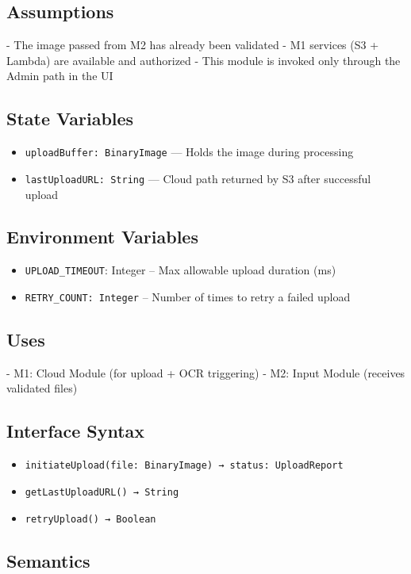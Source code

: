 \documentclass[12pt, titlepage]{article}
\begin{document}
\subsection*{Assumptions}
- The image passed from M2 has already been validated  
- M1 services (S3 + Lambda) are available and authorized  
- This module is invoked only through the Admin path in the UI

\subsection*{State Variables}
\begin{itemize}
  \item \texttt{uploadBuffer: BinaryImage} — Holds the image during processing  
  \item \texttt{lastUploadURL: String} — Cloud path returned by S3 after successful upload
\end{itemize}

\subsection*{Environment Variables}
\begin{itemize}
\item \texttt{UPLOAD\_TIMEOUT}: Integer -- Max allowable upload duration (ms)

\item \texttt{RETRY\_COUNT: Integer} -- Number of times to retry a failed upload
\end{itemize}

\subsection*{Uses}
- M1: Cloud Module (for upload + OCR triggering)  
- M2: Input Module (receives validated files)

\subsection*{Interface Syntax}
\begin{itemize}
  \item \texttt{initiateUpload(file: BinaryImage) → status: UploadReport}  
  \item \texttt{getLastUploadURL() → String}  
  \item \texttt{retryUpload() → Boolean}
\end{itemize}

\subsection*{Semantics}
\end{document}
